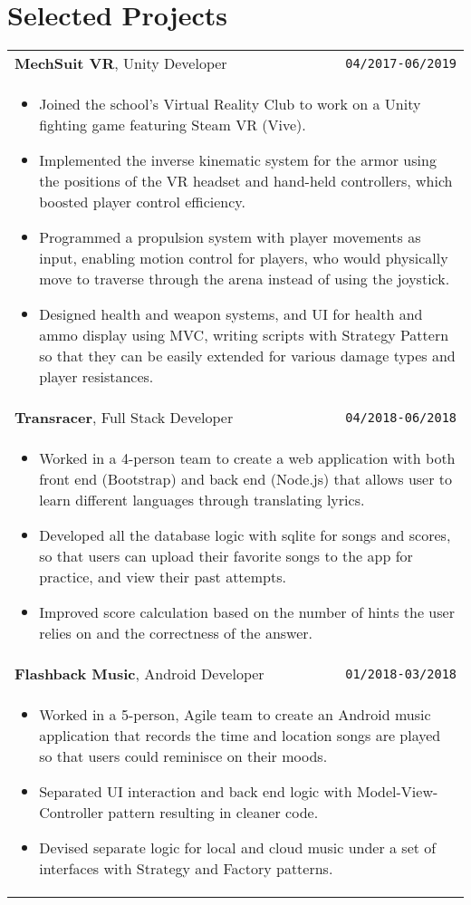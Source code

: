 \documentclass[10pt, letterpaper]{article}
\newcommand{\itemcols}[1]{
\multicolumn{2}{p{\dimexpr \linewidth-2\tabcolsep}}{
\begin{itemize}
#1
\end{itemize}
}
}
\begin{document}
\section{Selected Projects}
\smallskip
\noindent
\begin{tabularx}{\linewidth}{X r}
\textbf{\large MechSuit VR}, Unity Developer & \texttt{04/2017-06/2019} \\
\itemcols{
\item Joined the school's Virtual Reality Club to work on a Unity fighting game featuring Steam VR (Vive).
\item Implemented the inverse kinematic system for the armor using the positions of the VR headset and hand-held controllers, which boosted player control efficiency.
\item Programmed a propulsion system with player movements as input, enabling motion control for players, who would physically move to traverse through the arena instead of using the joystick.
\item Designed health and weapon systems, and UI for health and ammo display using MVC, writing scripts with Strategy Pattern so that they can be easily extended for various damage types and player resistances.
} \\

\textbf{\large Transracer}, Full Stack Developer & \texttt{04/2018-06/2018} \\
\itemcols{
\item Worked in a 4-person team to create a web application with both front end (Bootstrap) and back end (Node.js) that allows user to learn different languages through translating lyrics.
\item Developed all the database logic with sqlite for songs and scores, so that users can upload their favorite songs to the app for practice, and view their past attempts.
\item Improved score calculation based on the number of hints the user relies on and the correctness of the answer.
} \\

\textbf{\large Flashback Music}, Android Developer & \texttt{01/2018-03/2018} \\
\itemcols{
\item Worked in a 5-person, Agile team to create an Android music application that records the time and location songs are played so that users could reminisce on their moods.
\item Separated UI interaction and back end logic with Model-View-Controller pattern resulting in cleaner code.
\item Devised separate logic for local and cloud music under a set of interfaces with Strategy and Factory patterns.
} \\

\end{tabularx}
\end{document}
